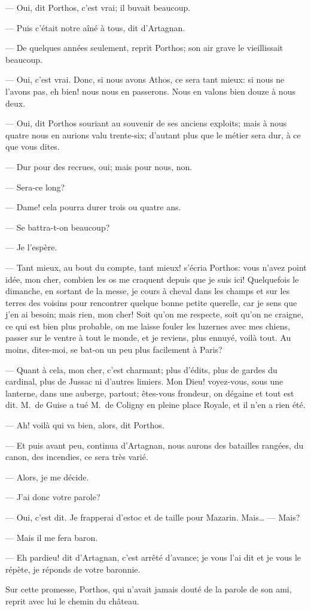 — Oui, dit Porthos, c'est vrai; il buvait beaucoup.

— Puis c'était notre aîné à tous, dit d'Artagnan.

— De quelques années seulement, reprit Porthos; son air grave le vieillissait beaucoup.

— Oui, c'est vrai. Donc, si nous avons Athos, ce sera tant mieux: si nous ne l'avons pas, eh bien! nous nous en passerons. Nous en valons bien douze à nous deux.

— Oui, dit Porthos souriant au souvenir de ses anciens exploits; mais à nous quatre nous en aurions valu trente-six; d'autant plus que le métier sera dur, à ce que vous dites.

— Dur pour des recrues, oui; mais pour nous, non.

— Sera-ce long?

— Dame! cela pourra durer trois ou quatre ans.

— Se battra-t-on beaucoup?

— Je l'espère.

— Tant mieux, au bout du compte, tant mieux! s'écria Porthos: vous n'avez point idée, mon cher, combien les os me craquent depuis que je suis ici! Quelquefois le dimanche, en sortant de la messe, je cours à cheval dans les champs et sur les terres des voisins pour rencontrer quelque bonne petite querelle, car je sens que j'en ai besoin; mais rien, mon cher! Soit qu'on me respecte, soit qu'on ne craigne, ce qui est bien plus probable, on me laisse fouler les luzernes avec mes chiens, passer sur le ventre à tout le monde, et je reviens, plus ennuyé, voilà tout. Au moins, dites-moi, se bat-on un peu plus facilement à Paris?

— Quant à cela, mon cher, c'est charmant; plus d'édits, plus de gardes du cardinal, plus de Jussac ni d'autres limiers. Mon Dieu! voyez-vous, sous une lanterne, dans une auberge, partout; êtes-vous frondeur, on dégaine et tout est dit. M.~de Guise a tué M.~de Coligny en pleine place Royale, et il n'en a rien été.

— Ah! voilà qui va bien, alors, dit Porthos.

— Et puis avant peu, continua d'Artagnan, nous aurons des batailles rangées, du canon, des incendies, ce sera très varié.

— Alors, je me décide.

— J'ai donc votre parole?

— Oui, c'est dit. Je frapperai d'estoc et de taille pour Mazarin. Mais\dots
— Mais?

— Mais il me fera baron.

— Eh pardieu! dit d'Artagnan, c'est arrêté d'avance; je vous l'ai dit et je vous le répète, je réponds de votre baronnie.

Sur cette promesse, Porthos, qui n'avait jamais douté de la parole de son ami, reprit avec lui le chemin du château.